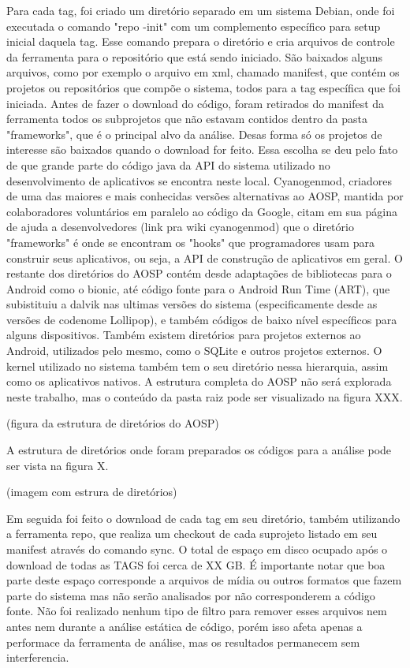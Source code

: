 Para cada tag, foi criado um diretório separado em um sistema Debian, onde foi executada o comando "repo -init" com um complemento específico para setup inicial daquela tag. Esse comando prepara o diretório e cria arquivos de controle da ferramenta para o repositório que está sendo iniciado. São baixados alguns arquivos, como por exemplo o arquivo em xml, chamado manifest, que contém os projetos ou repositórios que compõe o sistema, todos para a tag específica que foi iniciada. Antes de fazer o download do código, foram retirados do manifest da ferramenta todos os subprojetos que não estavam contidos dentro da pasta "frameworks", que é o principal alvo da análise. Desas forma só os projetos de interesse são baixados quando o download for feito. Essa escolha se deu pelo fato de que grande parte do código java da API do sistema utilizado no desenvolvimento de aplicativos se encontra neste local. Cyanogenmod, criadores de uma das maiores e mais conhecidas versões alternativas ao AOSP, mantida por colaboradores voluntários em paralelo ao código da Google, citam em sua página de ajuda a desenvolvedores (link pra wiki cyanogenmod) que o diretório "frameworks" é onde se encontram os "hooks" que programadores usam para construir seus aplicativos, ou seja, a API de construção de aplicativos em geral. O restante dos diretórios do AOSP contém desde adaptações de bibliotecas para o Android como o bionic, até código fonte para o Android Run Time (ART), que subistituiu a dalvik nas ultimas versões do sistema (especificamente desde as versões de codenome Lollipop), e também códigos de baixo nível específicos para alguns dispositivos. Também existem diretórios para projetos externos ao Android, utilizados pelo mesmo, como o SQLite e outros projetos externos. O kernel utilizado no sistema também tem o seu diretório nessa hierarquia, assim como os aplicativos nativos. A estrutura completa do AOSP não será explorada neste trabalho, mas o conteúdo da pasta raiz pode ser visualizado na figura XXX.

(figura da estrutura de diretórios do AOSP)

A estrutura de diretórios onde foram preparados os códigos para a análise pode ser vista na figura X.

(imagem com estrura de diretórios)

Em seguida foi feito o download de cada tag em seu diretório, também utilizando a ferramenta repo, que realiza um checkout de cada suprojeto listado em seu manifest através do comando sync. O total de espaço em disco ocupado após o download de todas as TAGS foi cerca de XX GB. É importante notar que boa parte deste espaço corresponde a arquivos de mídia ou outros formatos que fazem parte do sistema mas não serão analisados por não corresponderem a código fonte. Não foi realizado nenhum tipo de filtro para remover esses arquivos nem antes nem durante a análise estática de código, porém isso afeta apenas a performace da ferramenta de análise, mas os resultados permanecem sem interferencia.

